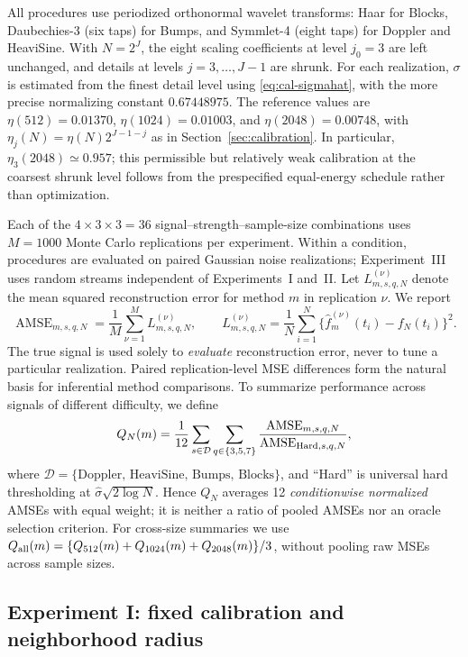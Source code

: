 \documentclass[12pt]{article}
\theoremstyle{definition}
\theoremstyle{definition}
\DeclareMathOperator{\AMSE}{AMSE}
\begin{document}
All procedures use periodized orthonormal wavelet transforms: Haar
for Blocks, Daubechies-3 (six taps) for Bumps, and Symmlet-4
(eight taps) for Doppler and HeaviSine. With $N=2^J$, the eight
scaling coefficients at level $j_0=3$ are left unchanged, and
details at levels $j=3,\ldots,J-1$ are shrunk. For each
realization, $\sigma$ is estimated from the finest detail level
using \eqref{eq:cal-sigmahat}, with the more precise normalizing
constant $0.67448975$. The reference values are
$\eta(512)=0.01370$, $\eta(1024)=0.01003$, and
$\eta(2048)=0.00748$, with
$\eta_j(N)=\eta(N)2^{J-1-j}$ as in
Section~\ref{sec:calibration}. In particular,
$\eta_3(2048)\simeq0.957$; this permissible but relatively weak
calibration at the coarsest shrunk level follows from the
prespecified equal-energy schedule rather than optimization.

Each of the $4\times3\times3=36$ signal--strength--sample-size
combinations uses $M=1000$ Monte Carlo replications per experiment.
Within a condition, procedures are evaluated on paired Gaussian
noise realizations; Experiment~III uses random streams independent
of Experiments~I and~II. Let $L_{m,s,q,N}^{(\nu)}$ denote the
mean squared reconstruction error for method $m$ in replication $\nu$.
We report
\begin{equation}
\AMSE_{m,s,q,N}
 =\frac1M\sum_{\nu=1}^M L_{m,s,q,N}^{(\nu)},\qquad
L_{m,s,q,N}^{(\nu)}=\frac1N\sum_{i=1}^N
\{\widehat f_{m}^{(\nu)}(t_i)-f_N(t_i)\}^2.
\label{eq:simul-plan-amse}
\end{equation}
The true signal is used solely to \emph{evaluate} reconstruction error,
never to tune a particular realization. Paired replication-level
MSE differences form the natural basis for inferential method
comparisons. To summarize performance across signals of different
difficulty, we define
\begin{equation}
Q_N(m)=\frac1{12}\sum_{s\in\mathcal D}\sum_{q\in\{3,5,7\}}
\frac{\AMSE_{m,s,q,N}}{\AMSE_{{\rm Hard},s,q,N}},
\label{eq:simul-overall-score}
\end{equation}
where $\mathcal D=\{\text{Doppler, HeaviSine, Bumps, Blocks}\}$,
and ``Hard'' is universal hard thresholding at
$\widehat\sigma\sqrt{2\log N}$. Hence $Q_N$ averages 12
\emph{conditionwise normalized} AMSEs with equal weight; it is
neither a ratio of pooled AMSEs nor an oracle selection criterion.
For cross-size summaries we use
$Q_{\rm all}(m)=\{Q_{512}(m)+Q_{1024}(m)+Q_{2048}(m)\}/3$,
without pooling raw MSEs across sample sizes.

\subsection{Experiment I: fixed calibration and neighborhood radius}
\label{sec:simul-fixed}
\end{document}
